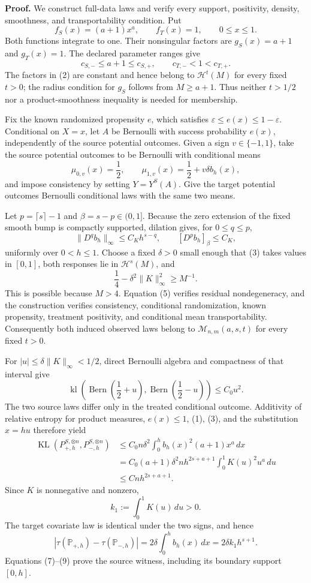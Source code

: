 \textbf{Proof.}
We construct full-data laws and verify every support, positivity, density, smoothness, and transportability condition.  Put
\[
f_S(x)=(a+1)x^a,
\qquad
f_T(x)=1,
\qquad 0\le x\le1.
\tag{1}
\]
Both functions integrate to one.  Their nonsingular factors are \(g_S(x)=a+1\) and \(g_T(x)=1\).  The declared parameter ranges give
\[
c_{S,-}\le a+1\le c_{S,+},
\qquad
c_{T,-}<1<c_{T,+}.
\tag{2}
\]
The factors in (2) are constant and hence belong to \(\mathcal H^t(M)\) for every fixed \(t>0\); the radius condition for \(g_S\) follows from \(M\ge a+1\).  Thus neither \(t>1/2\) nor a product-smoothness inequality is needed for membership.

Fix the known randomized propensity \(e\), which satisfies \(\varepsilon\le e(x)\le1-\varepsilon\).  Conditional on \(X=x\), let \(A\) be Bernoulli with success probability \(e(x)\), independently of the source potential outcomes.  Given a sign \(v\in\{-1,1\}\), take the source potential outcomes to be Bernoulli with conditional means
\[
\mu_{0,v}(x)=\frac12,
\qquad
\mu_{1,v}(x)=\frac12+v\delta b_h(x),
\tag{3}
\]
and impose consistency by setting \(Y=Y^S(A)\).  Give the target potential outcomes Bernoulli conditional laws with the same two means.

Let \(p=\lceil s\rceil-1\) and \(\beta=s-p\in(0,1]\).  Because the zero extension of the fixed smooth bump is compactly supported, dilation gives, for \(0\le q\le p\),
\[
\lVert D^q b_h\rVert_\infty\le C_Kh^{s-q},
\qquad
[D^p b_h]_{\beta}\le C_K,
\tag{4}
\]
uniformly over \(0<h\le1\).  Choose a fixed \(\delta>0\) small enough that (3) takes values in \([0,1]\), both responses lie in \(\mathcal H^s(M)\), and
\[
\frac14-\delta^2\lVert K\rVert_\infty^2\ge M^{-1}.
\tag{5}
\]
This is possible because \(M>4\).  Equation (5) verifies residual nondegeneracy, and the construction verifies consistency, conditional randomization, known propensity, treatment positivity, and conditional mean transportability.  Consequently both induced observed laws belong to \(\mathcal M_{n,m}(a,s,t)\) for every fixed \(t>0\).

For \(|u|\le\delta\lVert K\rVert_\infty<1/2\), direct Bernoulli algebra and compactness of that interval give
\[
\operatorname{kl}\!\left(\operatorname{Bern}\!\left(\frac12+u\right),
\operatorname{Bern}\!\left(\frac12-u\right)\right)
\le C_0u^2.
\tag{6}
\]
The two source laws differ only in the treated conditional outcome.  Additivity of relative entropy for product measures, \(e(x)\le1\), (1), (3), and the substitution \(x=hu\) therefore yield
\[
\begin{aligned}
\operatorname{KL}(P_{+,h}^{S,\otimes n},P_{-,h}^{S,\otimes n})
&\le C_0n\delta^2\int_0^hb_h(x)^2(a+1)x^a\,dx\\
&=C_0(a+1)\delta^2nh^{2s+a+1}
  \int_0^1K(u)^2u^a\,du\\
&\le Cnh^{2s+a+1}.
\end{aligned}
\tag{7}
\]
Since \(K\) is nonnegative and nonzero,
\[
k_1:=\int_0^1K(u)\,du>0.
\tag{8}
\]
The target covariate law is identical under the two signs, and hence
\[
|\tau(\mathbb P_{+,h})-\tau(\mathbb P_{-,h})|
=2\delta\int_0^hb_h(x)\,dx
=2\delta k_1h^{s+1}.
\tag{9}
\]
Equations (7)--(9) prove the source witness, including its boundary support \([0,h]\).

